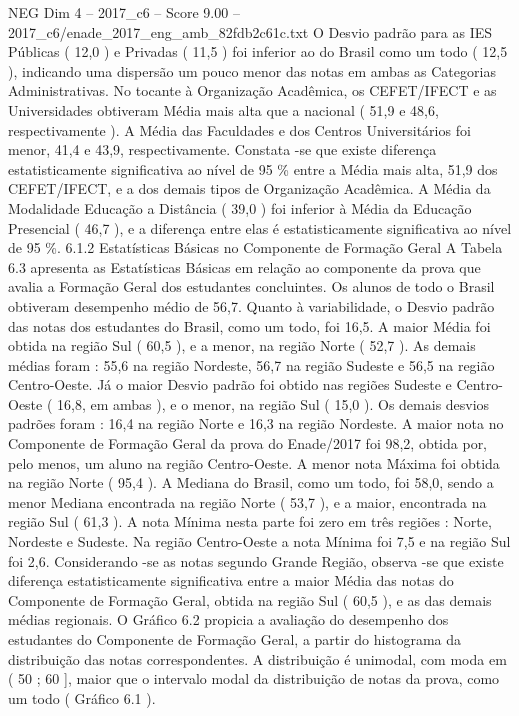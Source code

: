 \begin{textsample}{NEG Dim 4 – 2017\_c6 – Score 9.00 – 2017\_c6/enade\_2017\_eng\_amb\_82fdb2c61c.txt}
O Desvio padrão para as IES Públicas ( 12,0 ) e Privadas ( 11,5 ) foi inferior ao do Brasil como um todo ( 12,5 ), indicando uma dispersão um pouco menor das notas em ambas as Categorias Administrativas.
No tocante à Organização Acadêmica, os CEFET/IFECT e as Universidades obtiveram Média mais alta que a nacional ( 51,9 e 48,6, respectivamente ).
A Média das Faculdades e dos Centros Universitários foi menor, 41,4 e 43,9, respectivamente.
Constata -se que existe diferença estatisticamente significativa ao nível de 95 \% entre a Média mais alta, 51,9 dos CEFET/IFECT, e a dos demais tipos de Organização Acadêmica.
A Média da Modalidade Educação a Distância ( 39,0 ) foi inferior à Média da Educação Presencial ( 46,7 ), e a diferença entre elas é estatisticamente significativa ao nível de 95 \%. 6.1.2 Estatísticas Básicas no Componente de Formação Geral A Tabela 6.3 apresenta as Estatísticas Básicas em relação ao componente da prova que avalia a Formação Geral dos estudantes concluintes.
Os alunos de todo o Brasil obtiveram desempenho médio de 56,7.
Quanto à variabilidade, o Desvio padrão das notas dos estudantes do Brasil, como um todo, foi 16,5.
A maior Média foi obtida na região Sul ( 60,5 ), e a menor, na região Norte ( 52,7 ).
As demais médias foram : 55,6 na região Nordeste, 56,7 na região Sudeste e 56,5 na região Centro-Oeste.
Já o maior Desvio padrão foi obtido nas regiões Sudeste e Centro-Oeste ( 16,8, em ambas ), e o menor, na região Sul ( 15,0 ).
Os demais desvios padrões foram : 16,4 na região Norte e 16,3 na região Nordeste.
A maior nota no Componente de Formação Geral da prova do Enade/2017 foi 98,2, obtida por, pelo menos, um aluno na região Centro-Oeste.
A menor nota Máxima foi obtida na região Norte ( 95,4 ).
A Mediana do Brasil, como um todo, foi 58,0, sendo a menor Mediana encontrada na região Norte ( 53,7 ), e a maior, encontrada na região Sul ( 61,3 ).
A nota Mínima nesta parte foi zero em três regiões : Norte, Nordeste e Sudeste.
Na região Centro-Oeste a nota Mínima foi 7,5 e na região Sul foi 2,6.
Considerando -se as notas segundo Grande Região, observa -se que existe diferença estatisticamente significativa entre a maior Média das notas do Componente de Formação Geral, obtida na região Sul ( 60,5 ), e as das demais médias regionais.
O Gráfico 6.2 propicia a avaliação do desempenho dos estudantes do Componente de Formação Geral, a partir do histograma da distribuição das notas correspondentes.
A distribuição é unimodal, com moda em ( 50 ; 60 ], maior que o intervalo modal da distribuição de notas da prova, como um todo ( Gráfico 6.1 ).

\end{textsample}
